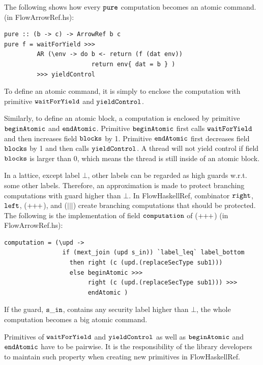 \documentclass[a4paper]{report}
\newcommand{\arrowop}[1]{$#1\negthickspace #1\negthickspace #1$}
\newcommand{\co}[1]{$\cod{#1}$}
\begin{document}
The following shows how every \co{pure} computation becomes an atomic command. 
(in FlowArrowRef.hs):
\begin{Verbatim}[fontsize=\footnotesize]
pure :: (b -> c) -> ArrowRef b c
pure f = waitForYield >>>
         AR (\env -> do b <- return (f (dat env))
                        return env{ dat = b } )
         >>> yieldControl
\end{Verbatim}
To define an atomic command, it is simply to enclose the computation with primitive
\co{waitForYield} and \co{yieldControl}.


Similarly, to define an atomic block, a computation is enclosed by primitive
\co{beginAtomic} and \co{endAtomic}.
Primitive \co{beginAtomic} first calls \co{waitForYield} and then increases field \co{blocks} by 1.
Primitive \co{endAtomic} first decreases field \co{blocks} by 1 and then calls \co{yieldControl}.
A thread will not yield control if field \co{blocks} is larger than 0, which means
the thread is still inside of an atomic block.

In a lattice,
except label $\bot$, other labels can be regarded as high guards w.r.t. some other labels. Therefore,
an approximation is made to protect branching computations with guard higher than $\bot$. 
In FlowHaskellRef, combinator \co{right}, \co{left},
(\arrowop{+}), and ($|||$) create branching computations that should be protected.
The following is the implementation of field \co{computation} of (\arrowop{+})
(in FlowArrowRef.hs):
\begin{Verbatim}[fontsize=\footnotesize]
computation = (\upd ->
                if (mext_join (upd s_in)) `label_leq` label_bottom
                  then right (c (upd.(replaceSecType sub1)))
                  else beginAtomic >>> 
                       right (c (upd.(replaceSecType sub1))) >>> 
                       endAtomic )
\end{Verbatim}
If the guard, \co{s\_in}, contains any security label higher than $\bot$, the whole computation
becomes a big atomic command.

Primitives of \co{waitForYield} and \co{yieldControl} as well as \co{beginAtomic} and \co{endAtomic} 
have to be pairwise. It is the responsibility of the library developers to
maintain such property when creating new primitives in FlowHaskellRef.
\end{document}
